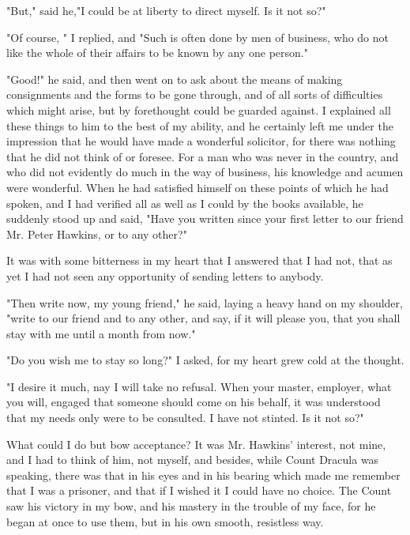 "But," said he,"I could be at liberty to direct myself. Is it not so?" 

"Of course, " I replied, and "Such is often done by men of business, who do not like the whole of their affairs to be known by any one person." 

"Good!" he said, and then went on to ask about the means of making consignments and the forms to be gone through, and of all sorts of difficulties which might arise, but by forethought could be guarded against. I explained all these things to him to the best of my ability, and he certainly left me under the impression that he would have made a wonderful solicitor, for there was nothing that he did not think of or foresee. For a man who was never in the country, and who did not evidently do much in the way of business, his knowledge and acumen were wonderful. When he had satisfied himself on these points of which he had spoken, and I had verified all as well as I could by the books available, he suddenly stood up and said, "Have you written since your first letter to our friend Mr. Peter Hawkins, or to any other?" 

It was with some bitterness in my heart that I answered that I had not, that as yet I had not seen any opportunity of sending letters to anybody. 

"Then write now, my young friend," he said, laying a heavy hand on my shoulder, "write to our friend and to any other, and say, if it will please you, that you shall stay with me until a month from now." 

"Do you wish me to stay so long?" I asked, for my heart grew cold at the thought. 

"I desire it much, nay I will take no refusal. When your master, employer, what you will, engaged that someone should come on his behalf, it was understood that my needs only were to be consulted. I have not stinted. Is it not so?" 

What could I do but bow acceptance? It was Mr. Hawkins' interest, not mine, and I had to think of him, not myself, and besides, while Count Dracula was speaking, there was that in his eyes and in his bearing which made me remember that I was a prisoner, and that if I wished it I could have no choice. The Count saw his victory in my bow, and his mastery in the trouble of my face, for he began at once to use them, but in his own smooth, resistless way. 

